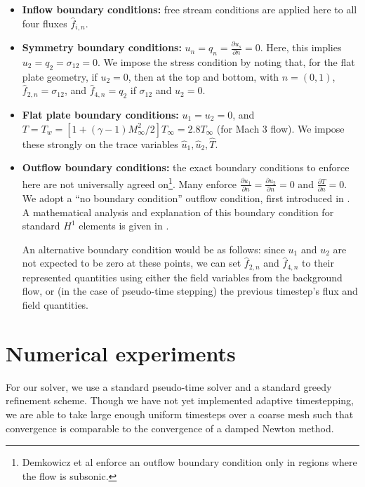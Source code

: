 \documentclass{article}
\newcommand{\pd}[2]{\frac{\partial#1}{\partial#2}}
\begin{document}
\begin{itemize}
\item \textbf{Inflow boundary conditions:} free stream conditions are applied here to all four fluxes $\widehat{f}_{i,n}$.
\item \textbf{Symmetry boundary conditions:} $u_n = q_n = \pd{u_s}{n} = 0$. Here, this implies $u_2 = q_2 = \sigma_{12} = 0$. We impose the stress condition by noting that, for the flat plate geometry, if $u_2 = 0$, then at the top and bottom, with $n = (0,1)$, $\widehat{f}_{2,n} = \sigma_{12}$, and $\widehat{f}_{4,n} = q_2$ if $\sigma_{12}$ and $u_2 = 0$. 
\item \textbf{Flat plate boundary conditions:} $u_1 = u_2 = 0$, and $T = T_w = \left[1+(\gamma-1)M_\infty^2/2\right] T_\infty = 2.8T_\infty$ (for Mach 3 flow). We impose these strongly on the trace variables $\widehat{u}_1, \widehat{u}_2, \widehat{T}$. 
\item \textbf{Outflow boundary conditions:} the exact boundary conditions to enforce here are not universally agreed on\footnote{Demkowicz et al enforce an outflow boundary condition only in regions where the flow is subsonic.\cite{Demkowicz:1990:NFE:112271.112276}}. Many enforce $\pd{u_1}{n}=\pd{u_2}{n}=0$ and $\pd{T}{n} = 0$. We adopt a ``no boundary condition'' outflow condition, first introduced in \cite{FLD:FLD1650140506}. A mathematical analysis and explanation of this boundary condition for standard $H^1$ elements is given in \cite{FLD:FLD505}. 

An alternative boundary condition would be as follows: since $u_1$ and $u_2$ are not expected to be zero at these points, we can set $\widehat{f}_{2,n}$ and $\widehat{f}_{4,n}$ to their represented quantities using either the field variables from the background flow, or (in the case of pseudo-time stepping) the previous timestep's flux and field quantities. 

\end{itemize}

\section{Numerical experiments}

For our solver, we use a standard pseudo-time solver and a standard greedy refinement scheme. Though we have not yet implemented adaptive timestepping, we are able to take large enough uniform timesteps over a coarse mesh such that convergence is comparable to the convergence of a damped Newton method. 
\end{document}

